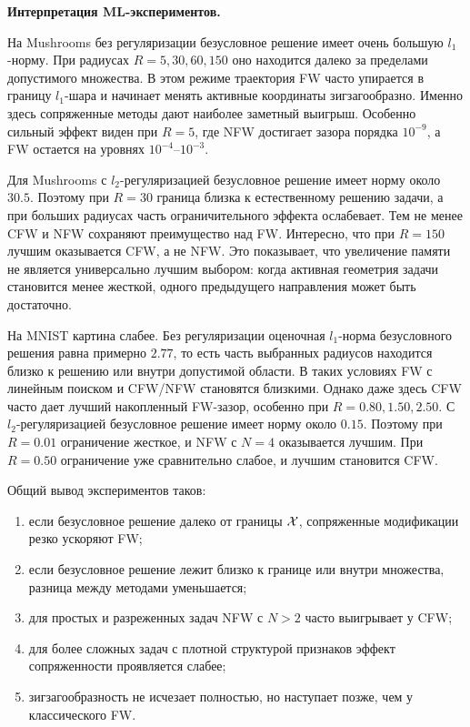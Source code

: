 \noindent\textbf{Интерпретация ML-экспериментов.}

На Mushrooms без регуляризации безусловное решение имеет очень большую $l_1$-норму.
При радиусах $R=5,30,60,150$ оно находится далеко за пределами допустимого множества.
В этом режиме траектория FW часто упирается в границу $l_1$-шара и начинает менять активные
координаты зигзагообразно.
Именно здесь сопряженные методы дают наиболее заметный выигрыш.
Особенно сильный эффект виден при $R=5$, где NFW достигает зазора порядка $10^{-9}$,
а FW остается на уровнях $10^{-4}$--$10^{-3}$.

Для Mushrooms с $l_2$-регуляризацией безусловное решение имеет норму около $30.5$.
Поэтому при $R=30$ граница близка к естественному решению задачи, а при больших радиусах
часть ограничительного эффекта ослабевает.
Тем не менее CFW и NFW сохраняют преимущество над FW.
Интересно, что при $R=150$ лучшим оказывается CFW, а не NFW.
Это показывает, что увеличение памяти не является универсально лучшим выбором:
когда активная геометрия задачи становится менее жесткой, одного предыдущего направления
может быть достаточно.

На MNIST картина слабее.
Без регуляризации оценочная $l_1$-норма безусловного решения равна примерно $2.77$,
то есть часть выбранных радиусов находится близко к решению или внутри допустимой области.
В таких условиях FW с линейным поиском и CFW/NFW становятся близкими.
Однако даже здесь CFW часто дает лучший накопленный FW-зазор, особенно при $R=0.80,1.50,2.50$.
С $l_2$-регуляризацией безусловное решение имеет норму около $0.15$.
Поэтому при $R=0.01$ ограничение жесткое, и NFW с $N=4$ оказывается лучшим.
При $R=0.50$ ограничение уже сравнительно слабое, и лучшим становится CFW.

Общий вывод экспериментов таков:
\begin{enumerate}
    \item если безусловное решение далеко от границы $\mathcal{X}$, сопряженные модификации резко ускоряют FW;
    \item если безусловное решение лежит близко к границе или внутри множества, разница между методами уменьшается;
    \item для простых и разреженных задач NFW с $N>2$ часто выигрывает у CFW;
    \item для более сложных задач с плотной структурой признаков эффект сопряженности проявляется слабее;
    \item зигзагообразность не исчезает полностью, но наступает позже, чем у классического FW.
\end{enumerate}


